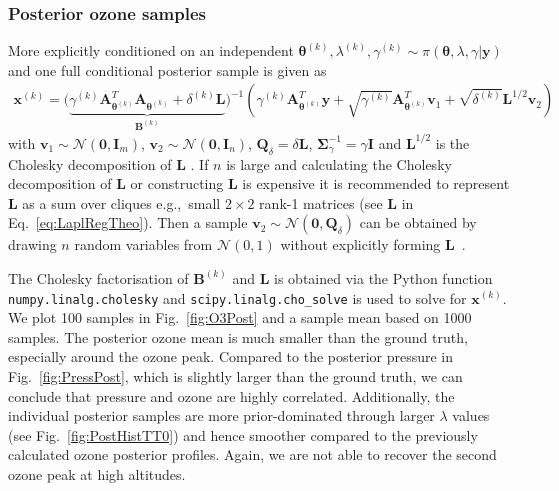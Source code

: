 \subsubsection{Posterior ozone samples}
More explicitly conditioned on an independent $\bm{\theta}^{(k)},\lambda^{(k)},\gamma^{(k)} \sim \pi(\bm{\theta},\lambda,\gamma | \bm{y})$ and one full conditional posterior sample is given as  
\begin{align}
	\label{eq:RTOAppl}
	\bm{x}^{(k)} = 	\Big(  \underbrace{\gamma^{(k)} \bm{A}_{\bm{\theta}^{(k)}}^T\bm{A}_{\bm{\theta}^{(k)}} +  \delta^{(k)}\bm{L}}_{\bm{B}^{(k)}} \Big)^{-1} \left(  \gamma^{(k)}  \bm{A}_{\bm{\theta}^{(k)}}^T\bm{y} +\sqrt{\gamma^{(k)}} \bm{A}_{\bm{\theta}^{(k)}}^T \bm{v}_1 + \sqrt{\delta^{(k)}}\bm{L}^{1/2}\bm{v}_2\right)
\end{align}
with $\bm{v}_1 \sim \mathcal{N}(\bm{0},  \bm{I}_m )$, $\bm{v}_2 \sim \mathcal{N}(\bm{0}, \bm{I}_n )$, $\bm{Q}_{\delta} = \delta  \bm{L} $, $\bm{\Sigma}^{-1}_{\gamma} = \gamma \bm{I}$ and $\bm{L}^{1/2}$ is the Cholesky decomposition of $\bm{L}$ \cite{bardsley2012mcmc}.
If $n$ is large and calculating the Cholesky decomposition of $\bm{L}$ or constructing $\bm{L}$ is expensive it is recommended to represent $\bm{L}$ as a sum over cliques e.g.,~small $2\times2$ rank-1 matrices (see $\bm{L}$ in Eq.~\ref{eq:LaplRegTheo}).
Then a sample $\bm{v}_2 \sim \mathcal{N}(\bm{0}, \bm{Q}_{\delta})$ can be obtained by drawing $n$ random variables from $\mathcal{N}(0,1)$ without explicitly forming $\bm{L}$~\cite{fox2016fast}.

The Cholesky factorisation of $\bm{B}^{(k)}$ and $\bm{L}$ is obtained via the Python function \texttt{numpy.linalg.cholesky} and \texttt{scipy.linalg.cho\_solve} is used to solve for $\bm{x}^{(k)}$.
We plot 100 samples in Fig.~\ref{fig:O3Post} and a sample mean based on 1000 samples.
The posterior ozone mean is much smaller than the ground truth, especially around the ozone peak.
Compared to the posterior pressure in Fig.~\ref{fig:PressPost}, which is slightly larger than the ground truth, we can conclude that pressure and ozone are highly correlated.
Additionally, the individual posterior samples are more prior-dominated through larger $\lambda$ values (see Fig.~\ref{fig:PostHistTT0}) and hence smoother compared to the previously calculated ozone posterior profiles.
Again, we are not able to recover the second ozone peak at high altitudes.


